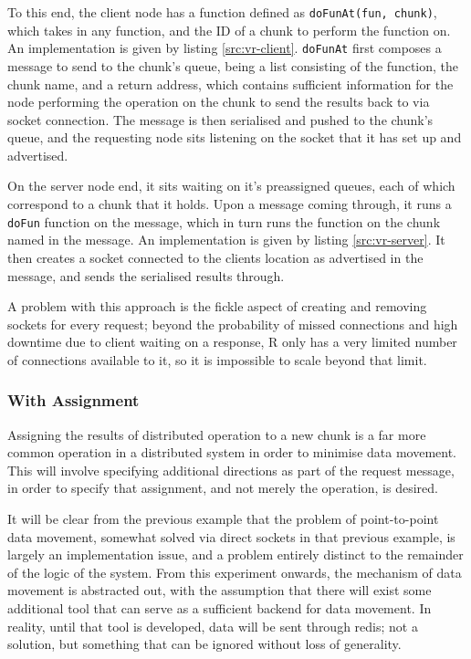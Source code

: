 To this end, the client node has a function defined as \texttt{doFunAt(fun,
chunk)}, which takes in any function, and the ID of a chunk to perform the
function on.
An implementation is given by listing \cref{src:vr-client}.
\texttt{doFunAt} first composes a message to send to the chunk's queue, being a
list consisting of the function, the chunk name, and a return address, which
contains sufficient information for the node performing the operation on the
chunk to send the results back to via socket connection.
The message is then serialised and pushed to the chunk's queue, and the
requesting node sits listening on the socket that it has set up and advertised.

On the server node end, it sits waiting on it's preassigned queues, each of
which correspond to a chunk that it holds. 
Upon a message coming through, it runs a \texttt{doFun} function on the
message, which in turn runs the function on the chunk named in the message. 
An implementation is given by listing \cref{src:vr-server}.
It then creates a socket connected to the clients location as advertised in
the message, and sends the serialised results through.

A problem with this approach is the fickle aspect of creating and removing
sockets for every request; beyond the probability of missed connections and
high downtime due to client waiting on a response, R only has a very limited
number of connections available to it, so it is impossible to scale beyond that
limit.

\subsubsection{With Assignment}

Assigning the results of distributed operation to a new chunk is a far more
common operation in a distributed system in order to minimise data movement.
This will involve specifying additional directions as part of the request
message, in order to specify that assignment, and not merely the operation, is
desired.

It will be clear from the previous example that the problem of point-to-point
data movement, somewhat solved via direct sockets in that previous example, is
largely an implementation issue, and a problem entirely distinct to the
remainder of the logic of the system.
From this experiment onwards, the mechanism of data movement is abstracted out,
with the assumption that there will exist some additional tool that can serve
as a sufficient backend for data movement.
In reality, until that tool is developed, data will be sent through redis; not
a solution, but something that can be ignored without loss of generality.

